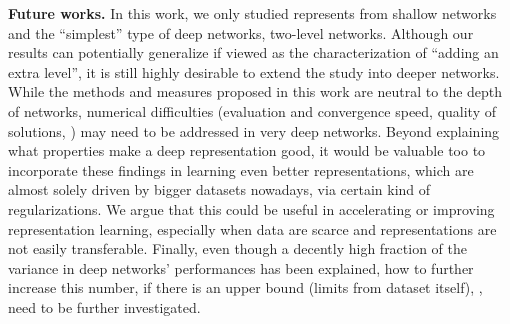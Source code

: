 \documentclass[10pt,twocolumn,letterpaper]{article}
\begin{document}
{\bf Future works.} In this work, we only studied represents from shallow networks and the ``simplest'' type of deep networks, two-level networks.
Although our results can potentially generalize if viewed as the characterization of ``adding an extra level'', it is still highly desirable to extend the study into deeper networks.
While the methods and measures proposed in this work are neutral to the depth of networks, numerical difficulties (\eg evaluation and convergence speed, quality of solutions, \etc) may need to be addressed in very deep networks.
Beyond explaining what properties make a deep representation good, it would be valuable too to incorporate these findings in learning even better representations, which are almost solely driven by bigger datasets nowadays, via certain kind of regularizations.  
We argue that this could be useful in accelerating or improving representation learning, especially when data are scarce and representations are not easily transferable.
Finally, even though a decently high fraction of the variance in deep networks' performances has been explained, how to further increase this number, if there is an upper bound (\eg limits from dataset itself), \etc, need to be further investigated.




{\small


}
\end{document}
